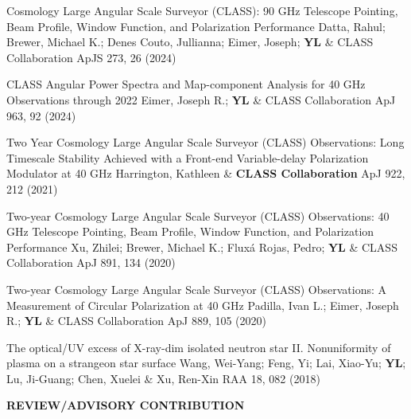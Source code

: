 \begin{etaremune}[topsep=0pt,itemsep=0pt,partopsep=0pt,parsep=0pt]
    \renewcommand\labelenumi{\footnotesize\bfseries\theenumi.}
    
            {Cosmology Large Angular Scale Surveyor (CLASS): 90 GHz Telescope Pointing, Beam Profile, Window Function, and Polarization Performance}
            {Datta, Rahul; Brewer, Michael K.; Denes Couto, Jullianna; Eimer, Joseph; \textbf{YL} \& CLASS Collaboration}
            {ApJS 273, 26 (2024)}
    
            {CLASS Angular Power Spectra and Map-component Analysis for 40 GHz Observations through 2022}
            {Eimer, Joseph R.; \textbf{YL} \& CLASS Collaboration}
            {ApJ 963, 92 (2024)}
    
            {Two Year Cosmology Large Angular Scale Surveyor (CLASS) Observations: Long Timescale Stability Achieved with a Front-end Variable-delay Polarization Modulator at 40 GHz}
            {Harrington, Kathleen \& \textbf{CLASS Collaboration}}
            {ApJ 922, 212 (2021)}
    
            {Two-year Cosmology Large Angular Scale Surveyor (CLASS) Observations: 40 GHz Telescope Pointing, Beam Profile, Window Function, and Polarization Performance}
            {Xu, Zhilei; Brewer, Michael K.; Fluxá Rojas, Pedro; \textbf{YL} \& CLASS Collaboration}
            {ApJ 891, 134 (2020)}
    
            {Two-year Cosmology Large Angular Scale Surveyor (CLASS) Observations: A Measurement of Circular Polarization at 40 GHz}
            {Padilla, Ivan L.; Eimer, Joseph R.; \textbf{YL} \& CLASS Collaboration}
            {ApJ 889, 105 (2020)}
    
            {The optical/UV excess of X-ray-dim isolated neutron star II. Nonuniformity of plasma on a strangeon star surface}
            {Wang, Wei-Yang; Feng, Yi; Lai, Xiao-Yu; \textbf{YL}; Lu, Ji-Guang; Chen, Xuelei \& Xu, Ren-Xin}
            {RAA 18, 082 (2018)}
    
\end{etaremune}
\begin{footnotesize}
    \textsf{\textbf{ REVIEW/ADVISORY CONTRIBUTION }}
\end{footnotesize}
